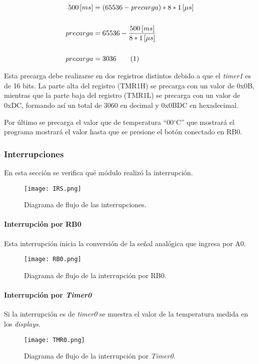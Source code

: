 \documentclass[12pt,a4paper]{article}
\newcommand\numberthis{\addtocounter{equation}{1}\tag{\theequation}}
\begin{document}
	\begin{align*}
	500\,[ms] &= (65536 - precarga) * 8 * 1\,[\mu s]\\
	\\ precarga &= 65536 - \frac{500\,[ms]}{8 * 1\,[\mu s]}\\
	\\ precarga &= 3036 \numberthis
	\end{align*}
	
	Esta precarga debe realizarse en dos registros distintos debido a que el \emph{timer1} es de 16 bits. La parte alta del registro (TMR1H) se precarga con un valor de 0x0B, mientras que la parte baja del registro (TMR1L) se precarga con un valor de 0xDC, formando así un total de 3060 en decimal y 0x0BDC en hexadecimal.	
	
	Por último se precarga el valor que de temperatura ``00$^{\circ}$C'' que mostrará el programa mostrará el valor hasta que se presione el botón conectado en RB0.
	
	\newpage
	\subsubsection{Interrupciones}
	En esta sección se verifica qué módulo realizó la interrupción.
	
	\begin{figure}[H]
	\texttt{[image: IRS.png]}
	\centering
	\caption{Diagrama de flujo de las interrupciones.}
	\label{IRS}
	\end{figure}		
	
	\newpage
	\paragraph{Interrupción por RB0} Esta interrupción inicia la conversión de la señal analógica que ingresa por A0.
	
	\begin{figure}[H]
	\texttt{[image: RB0.png]}
	\centering
	\caption{Diagrama de flujo de la interrupción por RB0.}
	\label{RB0}
	\end{figure}
	
	\paragraph{Interrupción por \emph{Timer0}} Si la interrupción es de \emph{timer0} se muestra el valor de la temperatura medida en los \emph{displays}.
	
	\begin{figure}[H]
	\texttt{[image: TMR0.png]}
	\centering
	\caption{Diagrama de flujo de la interrupción por \emph{Timer0}.}
	\label{TM0}
	\end{figure}
	
\end{document}
